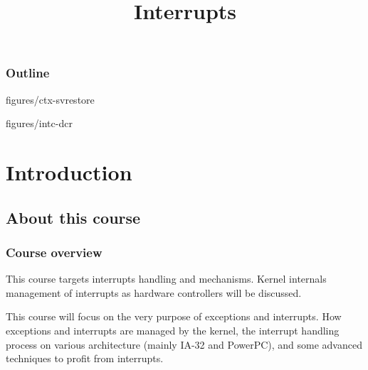 %
%
%
%
%
%

%
%

%
%

\def\path{../../../..}

%
%



%
%

\title{Interrupts}

%
%



%
%

\begin{frame}
  \titlepage
\end{frame}

%
%

\begin{frame}
  \frametitle{Outline}

  \tableofcontents
\end{frame}

%
%

                {figures/ctx-svrestore}

                {figures/intc-dcr}


%
%

%
%

\section{Introduction}

\subsection{About this course}


\begin{frame}
  \frametitle{Course overview}

  This course targets interrupts handling and mechanisms. Kernel internals management of interrupts as hardware controllers will be discussed.

  \-

This course will focus on the very purpose of exceptions and interrupts. How exceptions and interrupts are managed by the kernel, the interrupt handling process on various architecture (mainly IA-32 and PowerPC), and some advanced techniques to profit from interrupts.

\end{frame}

